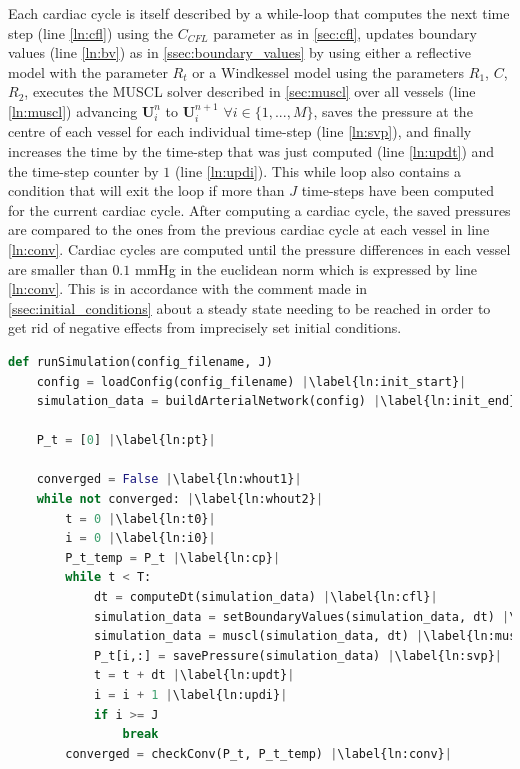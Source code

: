 \documentclass[a4paper, oneside]{discothesis}
\begin{document}
							Each cardiac cycle is itself described by a while-loop that computes the next time step (line \ref{ln:cfl}) using the $C_{CFL}$ parameter as in \autoref{sec:cfl}, updates boundary values (line \ref{ln:bv}) as in \autoref{ssec:boundary_values} by using either a reflective model with the parameter $R_t$ or a Windkessel model using the parameters $R_1$, $C$, $R_2$, executes the MUSCL solver described in \autoref{sec:muscl} over all vessels (line \ref{ln:muscl}) advancing $\mathbf{U}_i^{n}$ to $\mathbf{U}_i^{n+1}$ $\forall i \in \{1,...,M\}$, saves the pressure at the centre of each vessel for each individual time-step (line \ref{ln:svp}), and finally increases the time by the time-step that was just computed (line \ref{ln:updt}) and the time-step counter by $1$ (line \ref{ln:updi}).
							This while loop also contains a condition that will exit the loop if more than $J$ time-steps have been computed for the current cardiac cycle.
							After computing a cardiac cycle, the saved pressures are compared to the ones from the previous cardiac cycle at each vessel in line \ref{ln:conv}.
							Cardiac cycles are computed until the pressure differences in each vessel are smaller than $0.1$ mmHg in the euclidean norm which is expressed by line \ref{ln:conv}.
							This is in accordance with the comment made in \autoref{ssec:initial_conditions} about a steady state needing to be reached in order to get rid of negative effects from imprecisely set initial conditions.
\begin{lstlisting}[language=Python, caption=The code structure of an entire simulation is given here in pseudocode. Each line is detailed throughout this section., label=lst:pc, escapechar=|]
def runSimulation(config_filename, J)
	config = loadConfig(config_filename) |\label{ln:init_start}|
	simulation_data = buildArterialNetwork(config) |\label{ln:init_end}|

	P_t = [0] |\label{ln:pt}|

	converged = False |\label{ln:whout1}|
	while not converged: |\label{ln:whout2}|
		t = 0 |\label{ln:t0}|
		i = 0 |\label{ln:i0}|
		P_t_temp = P_t |\label{ln:cp}|
		while t < T:
			dt = computeDt(simulation_data) |\label{ln:cfl}|
			simulation_data = setBoundaryValues(simulation_data, dt) |\label{ln:bv}|
			simulation_data = muscl(simulation_data, dt) |\label{ln:muscl}|
			P_t[i,:] = savePressure(simulation_data) |\label{ln:svp}|
			t = t + dt |\label{ln:updt}|
			i = i + 1 |\label{ln:updi}|
			if i >= J
				break
		converged = checkConv(P_t, P_t_temp) |\label{ln:conv}|
						\end{lstlisting}
\end{document}
